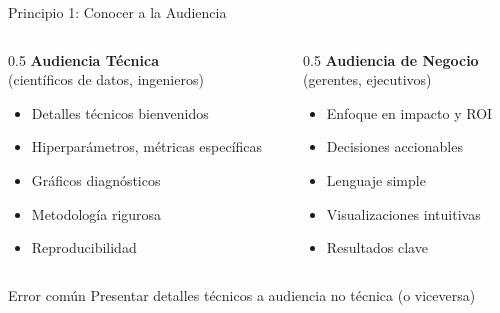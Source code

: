 \documentclass[aspectratio=169]{beamer}
\begin{document}
\begin{frame}{Principio 1: Conocer a la Audiencia}
\begin{columns}
\begin{column}{0.5\textwidth}
\textbf{Audiencia Técnica}\\
(científicos de datos, ingenieros)

\begin{itemize}
\item Detalles técnicos bienvenidos
\item Hiperparámetros, métricas específicas
\item Gráficos diagnósticos
\item Metodología rigurosa
\item Reproducibilidad
\end{itemize}
\end{column}

\begin{column}{0.5\textwidth}
\textbf{Audiencia de Negocio}\\
(gerentes, ejecutivos)

\begin{itemize}
\item Enfoque en impacto y ROI
\item Decisiones accionables
\item Lenguaje simple
\item Visualizaciones intuitivas
\item Resultados clave
\end{itemize}
\end{column}
\end{columns}

\vspace{0.4cm}

\begin{alertblock}{Error común}
Presentar detalles técnicos a audiencia no técnica (o viceversa)
\end{alertblock}
\end{frame}
\end{document}

